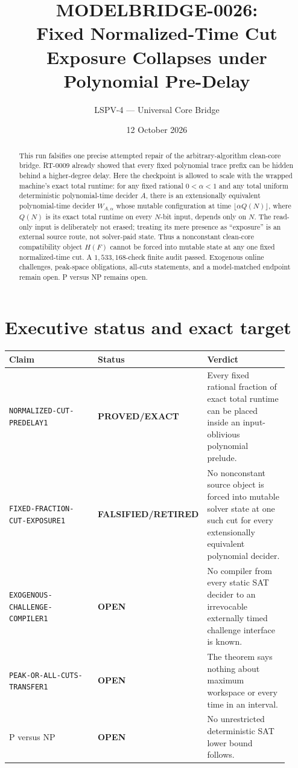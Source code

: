 \documentclass[11pt]{article}
\title{MODELBRIDGE-0026:\\Fixed Normalized-Time Cut Exposure Collapses under Polynomial Pre-Delay}
\author{LSPV-4 --- Universal Core Bridge}
\date{12 October 2026}
\newcommand{\EXACT}{\textbf{PROVED/EXACT}}
\newcommand{\OPEN}{\textbf{OPEN}}
\newcommand{\RETIRED}{\textbf{FALSIFIED/RETIRED}}
\begin{document}
\maketitle

\begin{abstract}
This run falsifies one precise attempted repair of the arbitrary-algorithm
clean-core bridge.  RT-0009 already showed that every fixed polynomial trace
prefix can be hidden behind a higher-degree delay.  Here the checkpoint is
allowed to scale with the wrapped machine's exact total runtime: for any fixed
rational $0<\alpha<1$ and any total uniform deterministic polynomial-time
decider $A$, there is an extensionally equivalent polynomial-time decider
$W_{A,\alpha}$ whose mutable configuration at time
$\lfloor\alpha Q(N)\rfloor$, where $Q(N)$ is its exact total runtime on every
$N$-bit input, depends only on $N$.  The read-only input is deliberately not
erased; treating its mere presence as ``exposure'' is an external source route,
not solver-paid state.  Thus a nonconstant clean-core compatibility object
$H(F)$ cannot be forced into mutable state at any one fixed normalized-time
cut.  A $1{,}533{,}168$-check finite audit passed.  Exogenous online challenges,
peak-space obligations, all-cuts statements, and a model-matched endpoint
remain open.  P versus NP remains open.
\end{abstract}

\section{Executive status and exact target}

\begin{center}\small
\begin{tabular}{p{0.38\linewidth}p{0.20\linewidth}p{0.34\linewidth}}
\toprule Claim & Status & Verdict\\ \midrule
\texttt{NORMALIZED-CUT-PREDELAY1} & \EXACT &
Every fixed rational fraction of exact total runtime can be placed inside an
input-oblivious polynomial prelude.\\
\texttt{FIXED-FRACTION-CUT-EXPOSURE1} & \RETIRED &
No nonconstant source object is forced into mutable solver state at one such
cut for every extensionally equivalent polynomial decider.\\
\texttt{EXOGENOUS-CHALLENGE-COMPILER1} & \OPEN &
No compiler from every static SAT decider to an irrevocable externally timed
challenge interface is known.\\
\texttt{PEAK-OR-ALL-CUTS-TRANSFER1} & \OPEN &
The theorem says nothing about maximum workspace or every time in an interval.\\
P versus NP & \OPEN & No unrestricted deterministic SAT lower bound follows.\\
\bottomrule
\end{tabular}
\end{center}
\end{document}
